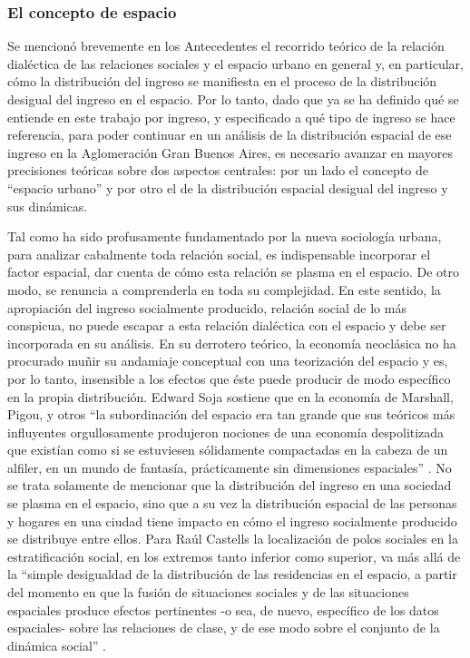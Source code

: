 	
	
	\subsubsection{El concepto de espacio}
	
	Se mencionó brevemente en los Antecedentes el recorrido teórico de la relación dialéctica de  las relaciones sociales y el espacio urbano en general y, en particular, cómo la distribución del ingreso se manifiesta en el proceso de la distribución desigual del ingreso en el espacio. Por lo tanto, dado que ya se ha definido qué se entiende en este trabajo por ingreso, y especificado a qué tipo de ingreso se hace referencia, para poder continuar en un análisis de la distribución espacial de ese ingreso en la Aglomeración Gran Buenos Aires, es necesario avanzar en mayores precisiones teóricas sobre dos aspectos centrales: por un lado el concepto de “espacio urbano” y por otro el de la distribución espacial desigual del ingreso y sus dinámicas.
	
	Tal como ha sido profusamente fundamentado por la nueva sociología urbana, para analizar cabalmente toda relación social, es indispensable incorporar el factor espacial, dar cuenta de cómo esta relación se plasma en el espacio. De otro modo, se renuncia a comprenderla en toda su complejidad. En este sentido, la apropiación del ingreso socialmente producido, relación social de lo más conspicua, no puede escapar a esta relación dialéctica con el espacio y debe ser incorporada en su análisis. En su derrotero teórico, la economía neoclásica no ha procurado muñir su andamiaje conceptual con una teorización del espacio y es, por lo tanto, insensible a los efectos que éste puede producir de modo específico en la propia distribución. Edward Soja sostiene que en la economía de Marshall, Pigou, y otros “la subordinación del espacio era tan grande que sus teóricos más influyentes orgullosamente produjeron nociones de una economía despolitizada que existían como si se estuviesen sólidamente compactadas en la cabeza de un alfiler, en un mundo de fantasía, prácticamente sin dimensiones espaciales” \cite[p.~32]{soja}. No se trata solamente de mencionar que la distribución del ingreso en una sociedad se plasma en el espacio, sino que a su vez la distribución espacial de las personas y hogares en una ciudad tiene impacto en cómo el ingreso socialmente producido se distribuye entre ellos. Para Raúl Castells la localización de polos sociales en la estratificación social, en los extremos tanto inferior como superior, va más allá de la “simple desigualdad de la distribución de las residencias en el espacio, a partir del momento en que la fusión de situaciones sociales y de las situaciones espaciales produce efectos pertinentes -o sea, de nuevo, específico de los datos espaciales- sobre las relaciones de clase, y de ese modo sobre el conjunto de la dinámica social” \cite[p.~213]{castells}.
	
